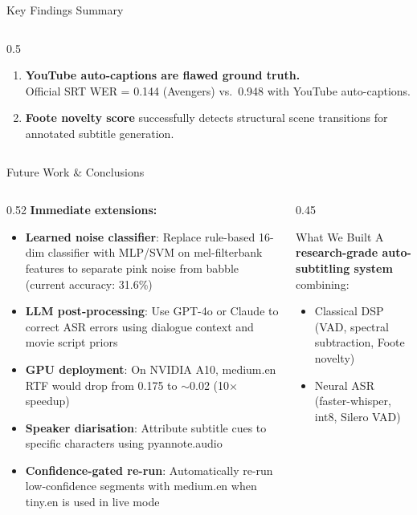 \documentclass[aspectratio=169]{beamer}
\begin{document}
\begin{frame}{Key Findings Summary}
\begin{columns}[T]
\begin{column}{0.5\textwidth}
\begin{enumerate}
        \item \textbf{YouTube auto-captions are flawed ground truth.}\\
          Official SRT WER = 0.144 (Avengers) vs.\ 0.948 with YouTube auto-captions.

        \item \textbf{Foote novelty score} successfully detects structural scene transitions for annotated subtitle generation.
      \end{enumerate}
    \end{column}
  \end{columns}
\end{frame}

\begin{frame}{Future Work \& Conclusions}
  \begin{columns}[T]
    \begin{column}{0.52\textwidth}
      \textbf{Immediate extensions:}
      \begin{itemize}
        \item \textbf{Learned noise classifier}: Replace rule-based 16-dim classifier with MLP/SVM on mel-filterbank features to separate pink noise from babble (current accuracy: 31.6\%)
        \item \textbf{LLM post-processing}: Use GPT-4o or Claude to correct ASR errors using dialogue context and movie script priors
        \item \textbf{GPU deployment}: On NVIDIA A10, medium.en RTF would drop from 0.175 to $\sim$0.02 (10$\times$ speedup)
        \item \textbf{Speaker diarisation}: Attribute subtitle cues to specific characters using pyannote.audio
        \item \textbf{Confidence-gated re-run}: Automatically re-run low-confidence segments with medium.en when tiny.en is used in live mode
      \end{itemize}
    \end{column}
    \begin{column}{0.45\textwidth}
      \begin{block}{What We Built}
        A \textbf{research-grade auto-subtitling system} combining:
        \begin{itemize}
          \item Classical DSP (VAD, spectral subtraction, Foote novelty)
          \item Neural ASR (faster-whisper, int8, Silero VAD)

\end{itemize}
\end{block}
\end{column}
\end{columns}
\end{frame}
\end{document}

